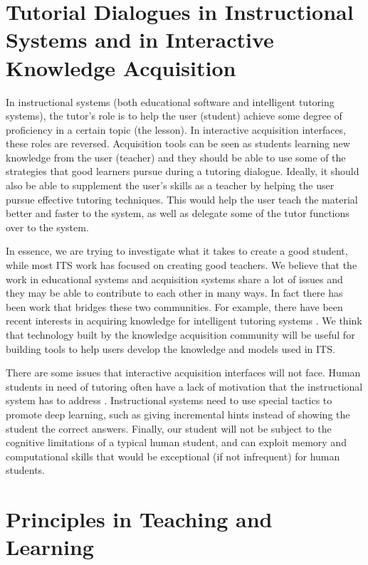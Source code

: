 \documentclass{llncs}
\begin{document}
\section{Tutorial Dialogues in Instructional Systems and in 
Interactive Knowledge Acquisition}

In instructional systems (both educational software and intelligent tutoring
systems), the tutor's role is to help the user (student) achieve some degree
of proficiency in a certain topic (the lesson).  In interactive acquisition
interfaces, these roles are reversed.  Acquisition tools can be seen
as students learning new knowledge from the user (teacher) and they should be
able to use some of the strategies that good learners pursue during a tutoring
dialogue.  Ideally, it should also be able to supplement the user's skills as
a teacher by helping the user pursue effective tutoring techniques.  This
would help the user teach the material better and faster to the system, as
well as delegate some of the tutor functions over to the system.

In essence, we are trying to investigate what it takes to create a good
student, while most ITS work has focused on creating good teachers.  We
believe that the work in educational systems and acquisition systems share a
lot of issues and they may be able to contribute to each other in many ways.
In fact there has been work that bridges these two communities.  For example,
there have been recent interests in acquiring knowledge for intelligent
tutoring systems \cite{Murray99}.  We think that technology built by the
knowledge acquisition community will be useful for building tools to help
users develop the knowledge and models used in ITS.

There are some issues that interactive acquisition interfaces will not face.
Human students in need of tutoring often have a lack of motivation that the
instructional system has to address \cite{Lepper93}.  Instructional systems
need to use special tactics to promote deep learning, such as giving
incremental hints instead of showing the student the correct answers.
Finally, our student will not be subject to the cognitive limitations of a
typical human student, and can exploit memory and computational skills that
would be exceptional (if not infrequent) for human students.


\section{Principles in Teaching and Learning}
\end{document}
